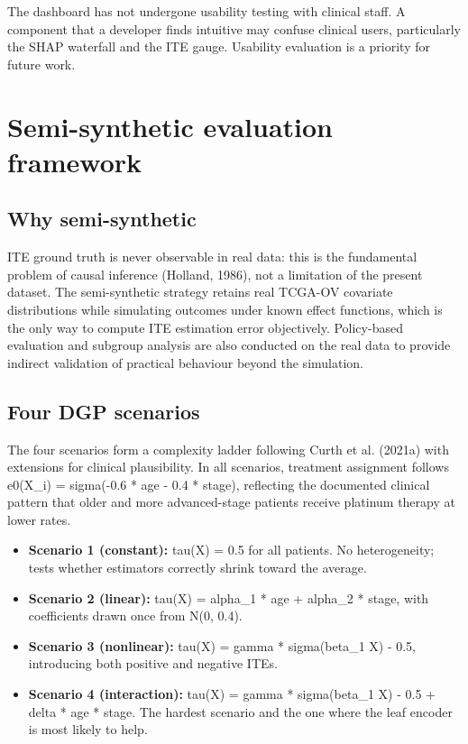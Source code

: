 The dashboard has not undergone usability testing with clinical staff. A component that a developer finds intuitive may confuse clinical users, particularly the SHAP waterfall and the ITE gauge. Usability evaluation is a priority for future work.

\section{Semi-synthetic evaluation framework}\label{semi-synthetic-evaluation-framework}

\subsection{Why semi-synthetic}\label{why-semi-synthetic}

ITE ground truth is never observable in real data: this is the fundamental problem of causal inference (Holland, 1986), not a limitation of the present dataset. The semi-synthetic strategy retains real TCGA-OV covariate distributions while simulating outcomes under known effect functions, which is the only way to compute ITE estimation error objectively. Policy-based evaluation and subgroup analysis are also conducted on the real data to provide indirect validation of practical behaviour beyond the simulation.

\subsection{Four DGP scenarios}\label{four-dgp-scenarios}

The four scenarios form a complexity ladder following Curth et al. (2021a) with extensions for clinical plausibility. In all scenarios, treatment assignment follows e0(X\_i) = sigma(-0.6 * age - 0.4 * stage), reflecting the documented clinical pattern that older and more advanced-stage patients receive platinum therapy at lower rates.

\begin{itemize}
\item
 \textbf{Scenario 1 (constant):} tau(X) = 0.5 for all patients. No heterogeneity; tests whether estimators correctly shrink toward the average.
\item
 \textbf{Scenario 2 (linear):} tau(X) = alpha\_1 * age + alpha\_2 * stage, with coefficients drawn once from N(0, 0.4).
\item
 \textbf{Scenario 3 (nonlinear):} tau(X) = gamma * sigma(beta\_1\textquotesingle{} X) - 0.5, introducing both positive and negative ITEs.
\item
 \textbf{Scenario 4 (interaction):} tau(X) = gamma * sigma(beta\_1\textquotesingle{} X) - 0.5 + delta * age * stage. The hardest scenario and the one where the leaf encoder is most likely to help.
\end{itemize}

